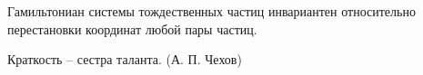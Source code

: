 Гамильтониан системы тождественных частиц инвариантен относительно перестановки
координат любой пары частиц.

Краткость -- сестра таланта. (А. П. Чехов)

